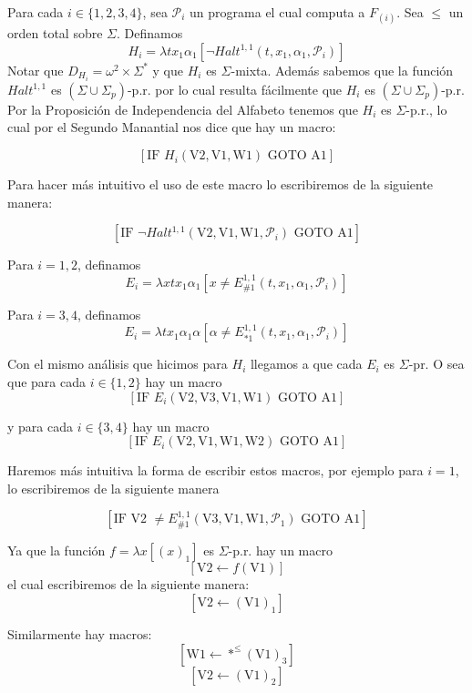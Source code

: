 \documentclass{article}
\begin{document}
Para cada \( i \in \{1,2,3,4\} \), sea \( \mathcal{P}_i \) un programa el cual computa a \( F_{(i)} \). Sea \( \leq \) un orden total sobre \( \Sigma \). Definamos
\[
H_i = \lambda t x_1 \alpha_1 \left[\neg Halt^{1,1}(t, x_1, \alpha_1, \mathcal{P}_i)\right]
\]
Notar que \( D_{H_i} = \omega^2 \times \Sigma^* \) y que \( H_i \) es \( \Sigma \)-mixta. Además sabemos que la función \( Halt^{1,1} \) es \( (\Sigma \cup \Sigma_p) \)-p.r. por lo cual resulta fácilmente que \( H_i \) es \( (\Sigma \cup \Sigma_p) \)-p.r. Por la Proposición de Independencia del Alfabeto tenemos que \( H_i \) es \( \Sigma \)-p.r., lo cual por el Segundo Manantial nos dice que hay un macro:

\[
[\text{IF } H_i(\text{V2}, \text{V1}, \text{W1}) \text{ GOTO A1}]
\]

Para hacer más intuitivo el uso de este macro lo escribiremos de la siguiente manera:

\[
[\text{IF } \neg Halt^{1,1}(\text{V2}, \text{V1}, \text{W1}, \mathcal{P}_i) \text{ GOTO A1}]
\]

Para \( i = 1, 2 \), definamos
\[
E_i = \lambda x t x_1 \alpha_1 \left[ x \neq E^{1,1}_{\#1}(t, x_1, \alpha_1, \mathcal{P}_i) \right]
\]

Para \( i = 3, 4 \), definamos
\[
E_i = \lambda t x_1 \alpha_1 \alpha \left[ \alpha \neq E^{1,1}_{\ast1}(t, x_1, \alpha_1, \mathcal{P}_i) \right]
\]

Con el mismo análisis que hicimos para $H_i$ llegamos a que cada $E_i$ es $\Sigma$-pr. O sea que para cada \( i \in \{1,2\} \) hay un macro
\[
[\text{IF } E_i(\text{V2}, \text{V3}, \text{V1}, \text{W1}) \text{ GOTO A1}]
\]

y para cada \( i \in \{3,4\} \) hay un macro
\[
[\text{IF } E_i(\text{V2}, \text{V1}, \text{W1}, \text{W2}) \text{ GOTO A1}]
\]

Haremos más intuitiva la forma de escribir estos macros, por ejemplo para \( i = 1 \), lo escribiremos de la siguiente manera

\[
[\text{IF V2 } \neq E^{1,1}_{\#1}(\text{V3}, \text{V1}, \text{W1}, \mathcal{P}_1) \text{ GOTO A1}]
\]

Ya que la función \( f = \lambda x[(x)_1] \) es \( \Sigma \)-p.r. hay un macro
\[
[\text{V2} \leftarrow f(\text{V1})]
\]
el cual escribiremos de la siguiente manera:
\[
[\text{V2} \leftarrow (\text{V1})_1]
\]

Similarmente hay macros:
\[
[\text{W1} \leftarrow *^{\leq}(\text{V1})_3]
\]
\[
[\text{V2} \leftarrow (\text{V1})_2]
\]
\end{document}
